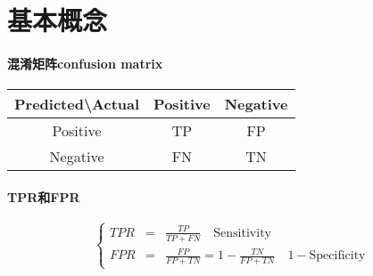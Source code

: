 \section{基本概念}

\paragraph*{混淆矩阵confusion matrix}

\begin{table}[H]
    \centering
    \begin{tabular}{ccc}
        \toprule
        Predicted\textbackslash Actual & Positive & Negative \\
        \midrule
        Positive                       & TP       & FP       \\
        Negative                       & FN       & TN       \\
        \bottomrule
    \end{tabular}
\end{table}

\paragraph*{TPR和FPR}

\begin{equation*}
    \left\{
    \begin{array}{rcl}
        TPR & = & \frac{TP}{TP + FN} \quad \text{Sensitivity}                              \\
        FPR & = & \frac{FP}{FP + TN} = 1 - \frac{TN}{FP + TN} \quad 1 - \text{Specificity}
    \end{array}
    \right.
\end{equation*}